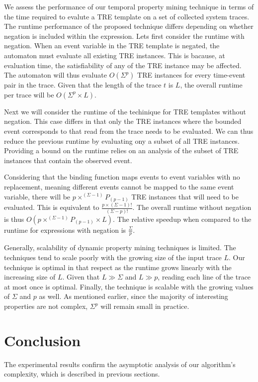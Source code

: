 \documentclass[]{sigplanconf}
\begin{document}
We assess the performance of our temporal property mining technique in terms of the time required to evalute a TRE template on a set of collected system traces.
The runtime performance of the proposed technique differs depending on whether negation is included within the expression.
Lets first consider the runtime with negation. When an event variable in the TRE template is negated, the automaton must evaluate all existing TRE instances. This is bacause, at evaluation time, the satisfiability of any of the TRE instance may be affected. The automaton will thus evaluate $O(\Sigma^p)$ TRE instances for every time-event pair in the trace. Given that the length of the trace $t$ is $L$, the overall runtime per trace will be $O(\Sigma^p \times L)$.

Next we will consider the runtime of the techinique for TRE templates without negation. This case differs in that only the TRE instances where the bounded event corresponds to that read from the trace needs to be evaluated. We can thus reduce the previous runtime by evaluating ony a subset of all TRE instances. Providing a bound on the runtime relies on an analysis of the subset of TRE instances that contain the observed event.

Considering that the binding function maps events to event variables with no replacement, meaning different events cannot be mapped to the same event variable, there will be $p \times ^{(\Sigma - 1)}P_{(p - 1)}$ TRE instances that will need to be evaluated. This is equivalent to $\frac{p \times (\Sigma - 1)!}{(\Sigma - p)!}$. The overall runtime without negation is thus
$O(p \times ^{(\Sigma - 1)}P_{(p - 1)} \times L)$. The relative speedup when compared to the runtime for expressions with negation is $\frac{\Sigma}{p}$.


Generally, scalability of dynamic property mining techniques is limited.
The techniques tend to scale poorly with the growing size of the input trace $L$. Our technique is optimal in that respect as the runtime grows linearly with the increasing size of $L$. Given that $L \gg \Sigma$ and $L \gg p$, reading each line of the trace at most once is optimal.
Finally, the technique is scalable with the growing values of $\Sigma$ and $p$ as well. As mentioned earlier, since the majority of interesting properties are not complex, $\Sigma^p$ will remain small in practice.

\section{Conclusion}

The experimental results confirm the asymptotic analysis of our algorithm's complexity, which is described in previous sections.


%


\end{document}

